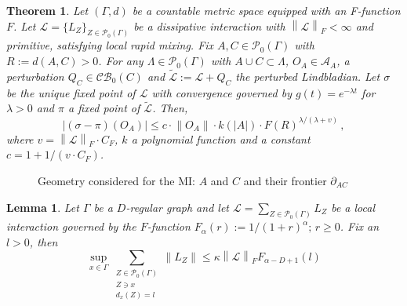 \documentclass[10pt,a4paper]{amsart}
\newtheorem{thm}{Theorem}
\newtheorem{lem}{Lemma}
\newcommand{\G}{\Gamma}
\newcommand{\LL}{\widetilde{\Li}}
\newcommand{\Li}{\mathcal{L}}
\newcommand{\abs}[1]{\left \vert#1\right\vert}
\newcommand{\norm}[1]{\left\lVert#1\right\rVert}
\newcommand{\normm}[2]{\left\lVert#1\right\rVert_{#2}}
\begin{document}
\begin{thm}\label{thm:localPerturbation}
    Let $(\Gamma,d)$ be a countable metric space equipped with an F-function $F$. Let $\Li=\{L_Z\}_{Z\in \mathcal{P}_0(\Gamma)}$ be a dissipative interaction with $\normm{\Li}{F}<\infty$ and primitive, satisfying local rapid mixing. Fix $A,C\in \mathcal{P}_0(\Gamma)$ with $R:=d(A,C)>0$. For any $\Lambda\in  \mathcal{P}_0(\Gamma)$ with $A\cup C \subset \Lambda$, $O_A\in \mathcal{A}_A$, a perturbation $Q_C\in \mathcal{CB}_0(C)$ and $\LL:=\Li+Q_C$ the perturbed \textit{Lindbladian}.
Let $\sigma$ be the unique fixed point of $\Li$ with convergence governed by $g(t)=e^{-\lambda t}$ for $\lambda >0$ and $\pi$ a fixed point of $\LL$.
Then,
    \begin{equation}\label{eq:diff_fixed_points_Lindbladians}
        \abs{(\sigma-\pi)(O_A)}\leq c\cdot \norm{O_A} \cdot k(\abs{A})\cdot F(R)^{\lambda/(\lambda +v)} \, ,
    \end{equation}
    where $v=\normm{\mathcal{L}}{F}\cdot C_F$, $k$ a polynomial function and a constant $c=1+1/(v\cdot C_F)$.
\end{thm}

\begin{figure}[!h]
    \centering
    
    \caption{Geometry considered for the MI: $A$ and $C$ and their frontier $\partial_{AC}$}
    \label{fig:MIgeometry}
\end{figure}

\begin{lem}\label{lem:technicalLemmaFfunction2}
    Let $\Gamma$ be a $D$-regular graph and let $\Li=\sum_{Z\in\mathcal{P}_0(\Gamma)}L_Z$ be a local interaction governed by the $F$-function $F_\alpha(r) :=1/(1+r)^\alpha;\,r\geq0$. Fix an $l>0$, then
    \begin{equation}
    \sup_{x\in\G}\sum\limits_{\substack{Z\in\mathcal{P}_0(\Gamma)\\ Z\ni x  \\ d_x(Z)= l}}\norm{L_Z}\leq \kappa \normm{\Li}{F} F_{\alpha -D+1}(l)
    \end{equation}
\end{lem}
\end{document}
